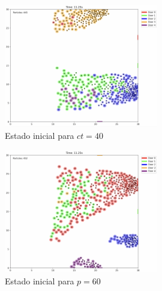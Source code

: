 \documentclass[12pt]{article}
\begin{document}
\begin{figure}[H]
\centering
\includegraphics[width=0.6\textwidth]{img/frames/t_40_&_p_0.50_middle.jpg}
\caption{Estado inicial para $ct=40$}
\label{fig:evac_time_ct}
\end{figure}

\begin{figure}[H]
\centering
\includegraphics[width=0.6\textwidth]{img/frames/t_60_&_p_0.50_middle.jpg}
\caption{Estado inicial para $p=60$}
\label{fig:evac_time_ct}
\end{figure}
\end{document}
